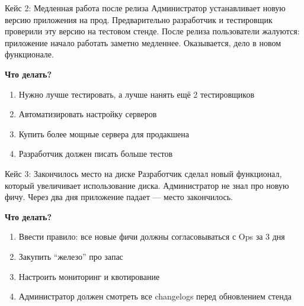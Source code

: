 \documentclass[aspectratio=169]{beamer}
\begin{document}
    \begin{frame}{Кейс 2: Медленная работа после релиза}
        Администратор устанавливает новую версию приложения на прод. Предварительно разработчик и тестировщик проверили
        эту версию на тестовом стенде. После релиза пользователи жалуются: приложение начало работать заметно медленнее.
        Оказывается, дело в новом функционале.

        \vspace{0.5cm}

        \textbf{Что делать?}
        \begin{enumerate}
            \item Нужно лучше тестировать, а лучше нанять ещё 2 тестировщиков
            \item Автоматизировать настройку серверов
            \item Купить более мощные сервера для продакшена
            \item Разработчик должен писать больше тестов
        \end{enumerate}
    \end{frame}

    \begin{frame}{Кейс 3: Закончилось место на диске}
        Разработчик сделал новый функционал, который увеличивает использование диска. Администратор не знал про новую фичу.
        Через два дня приложение падает — место закончилось.

        \vspace{0.5cm}

        \textbf{Что делать?}
        \begin{enumerate}
            \item Ввести правило: все новые фичи должны согласовываться с Ops за 3 дня
            \item Закупить \enquote{железо} про запас
            \item Настроить мониторинг и квотирование
            \item Администратор должен смотреть все changelogs перед обновлением стенда
        \end{enumerate}
    \end{frame}
\end{document}
